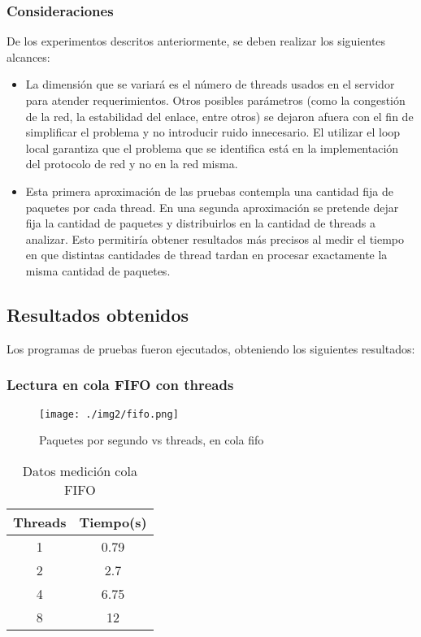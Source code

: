 \documentclass[12pt,spanish,letterpaper]{article}
\begin{document}
\subsubsection{Consideraciones}
\par De los experimentos descritos anteriormente, se deben realizar los siguientes alcances:
\begin{itemize}
	\item La dimensión que se variará es el número de threads usados en el servidor para atender requerimientos. Otros posibles parámetros (como la congestión de la red, la estabilidad del enlace, entre otros) se dejaron afuera con el fin de simplificar el problema y no introducir ruido innecesario. El utilizar el loop local garantiza que el problema que se identifica está en la implementación del protocolo de red y no en la red misma.
	\item Esta primera aproximación de las pruebas contempla una cantidad fija de paquetes por cada thread. En una segunda aproximación se pretende dejar fija la cantidad de paquetes y distribuirlos en la cantidad de threads a analizar. Esto permitiría obtener resultados más precisos al medir el tiempo en que distintas cantidades de thread tardan en procesar exactamente la misma cantidad de paquetes.
\end{itemize}
\subsection{Resultados obtenidos}
\par Los programas de pruebas fueron ejecutados, obteniendo los siguientes resultados:
\subsubsection{Lectura en cola FIFO con threads}
\begin{multicols}{2}
	\begin{figure}[H]
		\centering
		\texttt{[image: ./img2/fifo.png]}
		\caption{Paquetes por segundo vs threads, en cola fifo}
	\end{figure}
	\begin{table}[H]
		\centering
		\begin{tabular}{|c|c|}
		\hline
		Threads&Tiempo(s)\\
		\hline
		1&0.79\\
		2&2.7\\
		4&6.75\\
		8&12\\
		\hline
		\end{tabular}
		\caption{Datos medición cola FIFO}
	\end{table}
\end{multicols}
\end{document}
